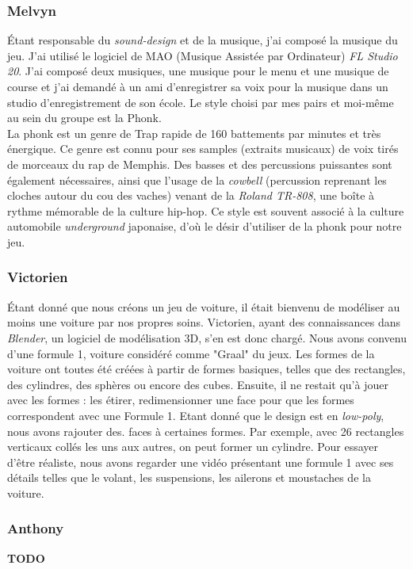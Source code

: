 \documentclass[12pt,a4paper]{article}
\begin{document}
\subsubsection{Melvyn}
Étant responsable du \textit{sound-design} et de la musique, j'ai composé la 
musique du jeu. J'ai utilisé le logiciel de MAO (Musique Assistée par Ordinateur) 
\textit{FL Studio 20}. J'ai composé deux musiques, une musique pour le menu et 
une musique de course et j'ai demandé à un ami d'enregistrer sa voix pour la musique dans 
un studio d'enregistrement de son école. Le style choisi par mes pairs et 
moi-même au sein du groupe est la Phonk.\\
La phonk est un genre de Trap rapide de 160 battements par minutes et très énergique. 
Ce genre est connu pour ses samples (extraits musicaux) de voix tirés de morceaux du
rap de Memphis. Des basses et des percussions puissantes sont également nécessaires, 
ainsi que l'usage de la \textit{cowbell} (percussion reprenant les cloches 
autour du cou des vaches) venant de la \textit{Roland TR-808}, 
une boîte à rythme mémorable de la culture hip-hop. 
Ce style est souvent associé à la culture automobile \textit{underground} 
japonaise, d'où le désir d'utiliser de la phonk pour notre jeu.

\subsubsection{Victorien}
Étant donné que nous créons un jeu de voiture, il était 
bienvenu de modéliser au moins une voiture par nos propres soins. 
Victorien, ayant des connaissances dans \textit{Blender}, un logiciel 
de modélisation 3D, s'en est donc chargé. 
Nous avons convenu d'une formule 1, voiture considéré comme "Graal" du jeux. 
Les formes de la voiture ont toutes été créées à partir de formes basiques,
telles que des rectangles, des cylindres, des sphères ou encore des cubes. 
Ensuite, il ne restait qu'à jouer avec les formes : les étirer, 
redimensionner une face pour que les formes correspondent avec une Formule 1. 
Etant donné que le design est en \textit{low-poly}, nous avons rajouter des. %
faces à certaines formes. Par exemple, avec 26 rectangles verticaux collés les 
uns aux autres, on peut former un cylindre.
Pour essayer d'être réaliste, nous avons regarder une 
vidéo présentant une formule 1 avec ses détails telles que le volant, 
les suspensions, les ailerons et moustaches de la voiture.

\subsubsection{Anthony}
\textbf{TODO}
\end{document}
